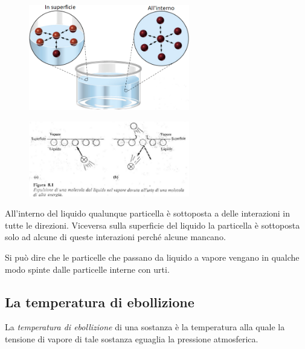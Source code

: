 \hspace{0.5cm}\begin{minipage}{0.5 \textwidth}
    \begin{figure}[H]
        \includegraphics[width=7cm]{immagini/interazioni_nel_liquido.png}
    \end{figure}
\end{minipage}
\begin{minipage}{0.5 \textwidth}
    \begin{figure}[H]
        \includegraphics[width=7cm]{immagini/espulsione_particelle.png}
    \end{figure}
\end{minipage}

\vspace{0.2cm}All'interno del liquido qualunque particella è sottoposta a delle interazioni in tutte le direzioni. Viceversa sulla superficie del liquido la particella è sottoposta solo ad alcune di queste interazioni perché alcune mancano. 

Si può dire che le particelle che passano da liquido a vapore vengano in qualche modo spinte dalle particelle interne con urti.

\subsection{La temperatura di ebollizione}
\vspace{0.2cm}La \textit{temperatura di ebollizione} di una sostanza è la temperatura alla quale la tensione di vapore di tale sostanza eguaglia la pressione atmosferica.

